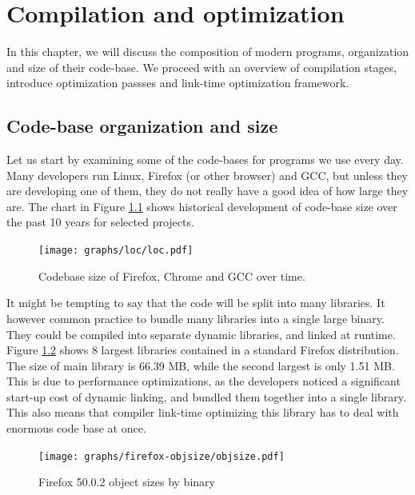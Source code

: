 \newcommand{\definice}{\paragraph{Definice.}}

\chapter{Compilation and optimization}

In this chapter, we will discuss the composition of modern
programs, organization and size of their code-base. We proceed with an
overview of compilation stages, introduce optimization passses and link-time
optimization framework.

\section{Code-base organization and size}

Let us start by examining some of the code-bases for programs we use every day.
Many developers run Linux, Firefox (or other browser) and GCC, but
unless they are developing one of them, they do not really have a good idea of how large
they are. The chart in Figure \ref{figure-loc} shows historical development of
code-base size over the past 10 years for selected projects.

\begin{figure}[!ht]
\centering
	\hspace{-1cm}\texttt{[image: graphs/loc/loc.pdf]}
\caption{Codebase size of Firefox, Chrome and GCC over time. }
\label{figure-loc}
\end{figure}

It might be tempting to say that the code will be split into many libraries. It
however common practice to bundle many libraries into a single large binary. They
could be compiled into separate dynamic libraries, and linked at runtime. Figure
\ref{figure-firefox-objsize} shows 8 largest libraries contained in a standard
Firefox distribution. The size of main library is 66.39 MB, while the second
largest is only 1.51 MB. This is due to performance optimizations, as the developers
noticed a significant start-up cost of dynamic linking, and
bundled them together into a single library. This also means that compiler
link-time optimizing this library has to deal with enormous code base at once.

\begin{figure}[!ht]
\centering
\texttt{[image: graphs/firefox-objsize/objsize.pdf]}
\caption{Firefox 50.0.2 object sizes by binary}
\label{figure-firefox-objsize}
\end{figure}

